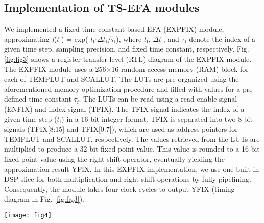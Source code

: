 \documentclass[10pt,journal]{IEEEtran}
\begin{document}
\subsection{Implementation of TS-EFA modules} \label{subsec:tsefa_imp}
We implemented a fixed time constant-based EFA (EXP\textunderscore FIX) module, approximating \textit{f}($t_\textrm{f}$) = exp(-$t_\textrm{f}$$\cdot$$\Delta t_\textrm{f}$$\mathbin{/}$$\tau_\textrm{f}$), where $t_\textrm{f}$, $\Delta t_\textrm{f}$, and $\tau_\textrm{f}$ denote the index of a given time step, sampling precision, and fixed time constant, respectively. 
Fig. \ref{fig:fig3} shows a register-transfer level (RTL) diagram of the EXP\textunderscore FIX module.
The EXP\textunderscore FIX module uses a 256$\times$16 random access memory (RAM) block for each of TEMP\textunderscore LUT and SCAL\textunderscore LUT.
The LUTs are pre-organized using the aforementioned memory-optimization procedure and filled with values for a pre-defined time constant $\tau_\textrm{f}$. 
The LUTs can be read using a read enable signal (EN\textunderscore FIX) and index signal (T\textunderscore FIX). 
The T\textunderscore FIX signal indicates the index of a given time step ($t_\textrm{f}$) in a 16-bit integer format. 
T\textunderscore FIX is separated into two 8-bit signals (T\textunderscore FIX[8:15] and T\textunderscore FIX[0:7]), which are used as address pointers for TEMP\textunderscore LUT and SCAL\textunderscore LUT, respectively. 
The values retrieved from the LUTs are multiplied to produce a 32-bit fixed-point value. 
This value is rounded to a 16-bit fixed-point value using the right shift operator, eventually yielding the approximation result Y\textunderscore FIX. 
In this EXP\textunderscore FIX implementation, we use one built-in DSP slice for both multiplication and right-shift operations by fully-pipelining. 
Consequently, the module takes four clock cycles to output Y\textunderscore FIX (timing diagram in Fig. \ref{fig:fig3}). 

\begin{figure*}[bh]\centering
    \texttt{[image: fig4]}
    \caption{\label{fig:fig4} RTL and timing diagrams of the EXP\textunderscore VAR module.} 
\end{figure*}
\end{document}
